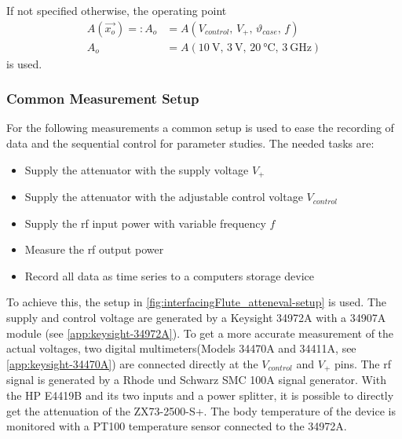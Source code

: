 If not specified otherwise, the operating point
\begin{align}\label{eq:interfacingFlute_operatingpoint}
A(\vec{x_o}) =: A_o &= A(V_{control},\,V_+,\,\vartheta_{case},\,f)\\
A_o                 &= A\left(\SI{10}{\volt},\,\SI{3}{\volt},\,\SI{20}{\celsius},\,\SI{3}{\GHz}\right)
\end{align}
is used.

\subsubsection{Common Measurement Setup}
For the following measurements a common setup is used to ease the recording of data and the sequential control for parameter studies. The needed tasks are:
\begin{itemize}
\item Supply the attenuator with the supply voltage $V_+$
\item Supply the attenuator with the adjustable control voltage $V_{control}$
\item Supply the \gls{rf} input power with variable frequency $f$
\item Measure the \gls{rf} output power
\item Record all data as time series to a computers storage device
\end{itemize}

To achieve this, the setup in \autoref{fig:interfacingFlute_atteneval-setup} is used.
The supply and control voltage are generated by a Keysight 34972A with a 34907A module (see \autoref{app:keysight-34972A}).
To get a more accurate measurement of the actual voltages, two digital multimeters(Models 34470A and 34411A, see \autoref{app:keysight-34470A}) are connected directly at the $V_{control}$ and $V_+$ pins.
The \gls{rf} signal is generated by a Rhode und Schwarz SMC 100A signal generator.
With the HP E4419B and its two inputs and a power splitter, it is possible to directly get the attenuation of the ZX73-2500-S+.
The body temperature of the device is monitored with a PT100 temperature sensor connected to the 34972A.

